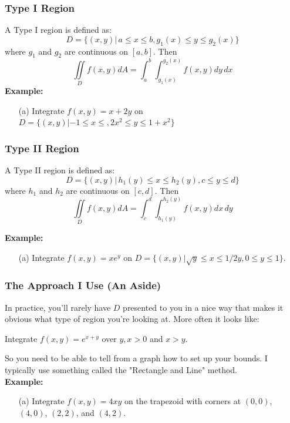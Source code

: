 \documentclass{beamer}
\begin{document}
\begin{frame}
\frametitle{Type I Region}
A Type I region is defined as:
$$D = \{(x,y)| \,a \leq x \leq b, g_1(x) \leq y \leq g_2(x)\}$$
where $g_1$ and $g_2$ are continuous on $[a,b]$. Then
$$\iint\limits_{D} f(x,y)dA = \int_a^b \int_{g_1(x)}^{g_2(x)} f(x,y)dy\,dx$$
\vspace{12pt}
\textbf{Example:}
\begin{itemize}
	\item [(a)] Integrate $f(x,y) = x+2y$ on $D = \{(x,y)|-1\leq x \leq, 2x^2 \leq y \leq 1+x^2\}$
\end{itemize}
\end{frame}

\begin{frame}
\frametitle{Type II Region}
A Type II region is defined as:
$$D = \{(x,y)| \,h_1(y) \leq x \leq h_2(y), c \leq y \leq d\}$$
where $h_1$ and $h_2$ are continuous on $[c,d]$. Then
$$\iint\limits_{D} f(x,y)dA = \int_c^d \int_{h_1(y)}^{h_2(y)} f(x,y)dx\,dy$$
\vspace{12pt}

\textbf{Example:}

\begin{itemize}
	\item[(a)] Integrate $f(x,y) = xe^{y}$ on $D = \{(x,y)|\sqrt{y}\leq x \leq 1/2y, 0\leq y \leq 1 \}$.
\end{itemize}
\end{frame}

\begin{frame}
\frametitle{The Approach I Use (An Aside)}
In practice, you'll rarely have $D$  presented to you in a nice way that makes it obvious what type of region you're looking at. More often it looks like:\\
\vspace{12pt}
\begin{center}
	Integrate $f(x,y) = e^{x+y}$ over $y,x>0$ and $x>y$.
\end{center}
\vspace{12pt}
So you need to be able to tell from a graph how to set up your bounds. I typically use something called the "Rectangle and Line" method.\\
\vspace{12pt}
\textbf{Example:}
\begin{itemize}
	\item[(a)] Integrate $f(x,y) = 4xy$ on the trapezoid with corners at $(0,0)$, $(4,0)$, $(2,2)$, and $(4,2)$.
\end{itemize}
\end{frame}
\end{document}
